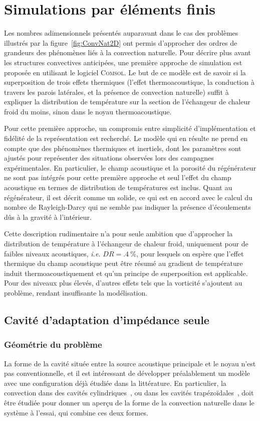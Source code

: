 \section{Simulations par éléments finis}\label{chap:FEM}
Les nombres adimensionnels présentés auparavant dans le cas des problèmes illustrés par la figure~\ref{fig:ConvNat2D} ont permis d'approcher des ordres de grandeurs des phénomènes liés à la convection naturelle. Pour décrire plus avant les structures convectives anticipées, une première approche de simulation est proposée en utilisant le logiciel \textsc{Comsol}\textss\textregistered. Le but de ce modèle est de savoir si la superposition de trois effets thermiques (l'effet thermoacoustique, la conduction à travers les parois latérales, et la présence de convection naturelle) suffit à expliquer la distribution de température sur la section de l'échangeur de chaleur froid du moins, sinon dans le noyau thermoacoustique.\medskip

Pour cette première approche, un compromis entre simplicité d'implémentation et fidélité de la représentation est recherché. Le modèle qui en résulte ne prend en compte que des phénomènes thermiques et inertiels, dont les paramètres sont ajustés pour représenter des situations observées lors des campagnes expérimentales. En particulier, le champ acoustique et la porosité du régénérateur ne sont pas intégrés pour cette première approche et seul l'effet du champ acoustique en termes de distribution de températures est inclus. Quant au régénérateur, il est décrit comme un solide, ce qui est en accord avec le calcul du nombre de Rayleigh-Darcy qui ne semble pas indiquer la présence d'écoulements dûs à la gravité à l'intérieur.\smallskip

Cette description rudimentaire n'a pour seule ambition que d'approcher la distribution de température à l'échangeur de chaleur froid, uniquement pour de faibles niveaux acoustiques, \textit{i.e.} $DR=\qty{.4}{\percent}$, pour lesquels on espère que l'effet thermique du champ acoustique peut être résumé au gradient de température induit thermoacoustiquement et qu'un principe de superposition est applicable. Pour des niveaux plus élevés, d'autres effets tels que la vorticité s'ajoutent au problème, rendant insuffisante la modélisation.


\subsection{Cavité d'adaptation d'impédance seule}\label{chap:CircuFluideV2}
\subsubsection{Géométrie du problème}
La forme de la cavité située entre la source acoustique principale et le noyau n'est pas conventionnelle, et il est intéressant de développer préalablement un modèle avec une configuration déjà étudiée dans la littérature. En particulier, la convection dans des cavités cylindriques~\cite{schneider_laminar_1992}, ou dans les cavités trapézoïdales~\cite{basak_heat_2009}, doit être étudiée pour donner un aperçu de la forme de la convection naturelle dans le système à l'essai, qui combine ces deux formes.\medskip


